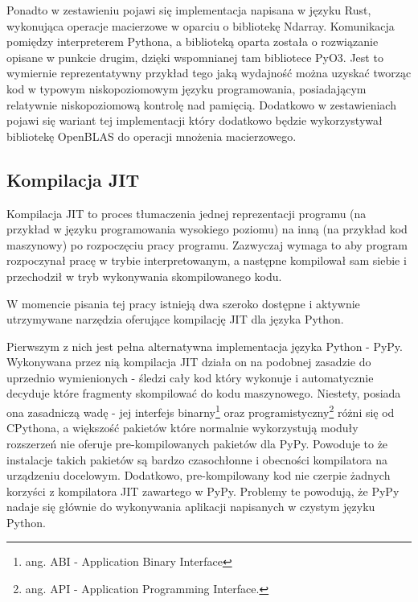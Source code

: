 \documentclass[11pt, a4paper]{article}
\begin{document}
\begin{sloppypar}
    Ponadto w zestawieniu pojawi się implementacja napisana w języku Rust, wykonująca
    operacje macierzowe w oparciu o bibliotekę Ndarray\cite{Ndarray}. Komunikacja
    pomiędzy interpreterem Pythona, a biblioteką oparta została o rozwiązanie opisane w punkcie
    drugim, dzięki wspomnianej tam bibliotece PyO3\cite{PyO3}. Jest to wymiernie
    reprezentatywny przykład tego jaką wydajność można uzyskać tworząc kod w typowym
    niskopoziomowym języku programowania, posiadającym relatywnie niskopoziomową kontrolę
    nad pamięcią. Dodatkowo w zestawieniach pojawi się wariant tej implementacji który
    dodatkowo będzie wykorzystywał bibliotekę OpenBLAS\cite{OpenBLAS}\cite{Ndarray} do
    operacji mnożenia macierzowego.

    \subsection{Kompilacja JIT}


    Kompilacja JIT to proces tłumaczenia jednej reprezentacji programu (na przykład w języku
    programowania wysokiego poziomu) na inną (na przykład kod maszynowy) po rozpoczęciu
    pracy programu. Zazwyczaj wymaga to aby program rozpoczynał pracę w trybie interpretowanym,
    a następne kompilował sam siebie i przechodził w tryb wykonywania skompilowanego
    kodu.

    W momencie pisania tej pracy istnieją dwa szeroko dostępne i aktywnie utrzymywane
    narzędzia oferujące kompilację JIT dla języka Python.

    Pierwszym z nich jest pełna alternatywna implementacja języka Python - PyPy\cite{PyPy_Home_Page}.
    Wykonywana przez nią kompilacja JIT działa on na podobnej zasadzie do uprzednio
    wymienionych - śledzi cały kod który wykonuje i automatycznie decyduje które
    fragmenty skompilować do kodu maszynowego\cite{PyPy_JIT}. Niestety, posiada ona zasadniczą
    wadę - jej interfejs binarny\footnote{ang. ABI - Application Binary Interface} oraz
    programistyczny\footnote{ang. API - Application Programming Interface.} różni się od
    CPythona, a większość pakietów które normalnie wykorzystują moduły rozszerzeń nie oferuje
    pre-kompilowanych pakietów dla PyPy. Powoduje to że instalacje takich pakietów są
    bardzo czasochłonne i obecności kompilatora na urządzeniu docelowym. Dodatkowo, pre-kompilowany
    kod nie czerpie żadnych korzyści z kompilatora JIT zawartego w PyPy. Problemy te powodują,
    że PyPy nadaje się głównie do wykonywania aplikacji napisanych w czystym języku
    Python.


\end{sloppypar}
\end{document}
